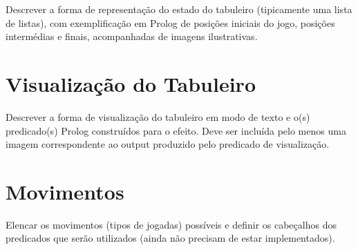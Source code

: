 \documentclass[a4paper]{article}
\begin{document}
Descrever a forma de representação do estado do tabuleiro (tipicamente uma lista de listas), com exemplificação em Prolog de posições iniciais do jogo, posições intermédias e finais, acompanhadas de imagens ilustrativas.


\section{Visualização do Tabuleiro}

Descrever a forma de visualização do tabuleiro em modo de texto e o(s) predicado(s) Prolog construídos para o efeito.
Deve ser incluída pelo menos uma imagem correspondente ao output produzido pelo predicado de visualização.


\section{Movimentos}

Elencar os movimentos (tipos de jogadas) possíveis e definir os cabeçalhos dos predicados que serão utilizados (ainda não precisam de estar implementados).
\end{document}
